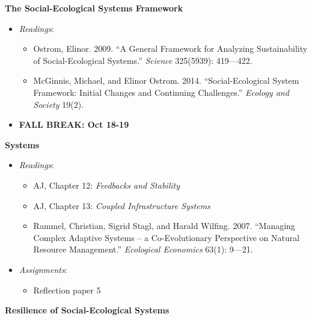 \week \textbf{The Social-Ecological Systems Framework}

\begin{itemize}

\item
  \emph{Readings}:

  \begin{itemize}
  
  \item
    Ostrom, Elinor. 2009. ``A General Framework for Analyzing
    Sustainability of Social-Ecological Systems.'' \emph{Science}
    325(5939): 419---422.
  \item
    McGinnis, Michael, and Elinor Ostrom. 2014. ``Social-Ecological
    System Framework: Initial Changes and Continuing Challenges.''
    \emph{Ecology and Society} 19(2).
  \end{itemize}
\item
  \textbf{FALL BREAK: Oct 18-19}
\end{itemize}

\week \textbf{Systems}

\begin{itemize}

\item
  \emph{Readings}:

  \begin{itemize}
  
  \item
    AJ, Chapter 12: \emph{Feedbacks and Stability}
  \item
    AJ, Chapter 13: \emph{Coupled Infrastructure Systems}
  \item
    Rammel, Christian, Sigrid Stagl, and Harald Wilfing. 2007.
    ``Managing Complex Adaptive Systems -- a Co-Evolutionary Perspective
    on Natural Resource Management.'' \emph{Ecological Economics} 63(1):
    9---21.
  \end{itemize}
\item
  \emph{Assignments}:

  \begin{itemize}
  
  \item
    Reflection paper 5
  \end{itemize}
\end{itemize}

\week \textbf{Resilience of Social-Ecological Systems}

